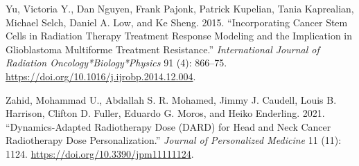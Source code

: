 \documentclass[
  letterpaper,
]{scrreprt}
\newlength{\cslhangindent}
\newenvironment{CSLReferences}[2] %
 {\begin{list}{}{%
  \setlength{\itemindent}{0pt}
  \setlength{\leftmargin}{0pt}
  \setlength{\parsep}{0pt}
  \ifodd #1
   \setlength{\leftmargin}{\cslhangindent}
   \setlength{\itemindent}{-1\cslhangindent}
  \fi
  \setlength{\itemsep}{#2\baselineskip}}}
 {\end{list}}
\theoremstyle{definition}
\theoremstyle{remark}
\begin{document}
\begin{CSLReferences}{1}{0}
Yu, Victoria Y., Dan Nguyen, Frank Pajonk, Patrick Kupelian, Tania
Kaprealian, Michael Selch, Daniel A. Low, and Ke Sheng. 2015.
{``Incorporating Cancer Stem Cells in Radiation Therapy Treatment
Response Modeling and the Implication in Glioblastoma Multiforme
Treatment Resistance.''} \emph{International Journal of Radiation
Oncology*Biology*Physics} 91 (4): 866--75.
\url{https://doi.org/10.1016/j.ijrobp.2014.12.004}.

Zahid, Mohammad U., Abdallah S. R. Mohamed, Jimmy J. Caudell, Louis B.
Harrison, Clifton D. Fuller, Eduardo G. Moros, and Heiko Enderling.
2021. {``Dynamics-Adapted Radiotherapy Dose (DARD) for Head and Neck
Cancer Radiotherapy Dose Personalization.''} \emph{Journal of
Personalized Medicine} 11 (11): 1124.
\url{https://doi.org/10.3390/jpm11111124}.

\end{CSLReferences}
\end{document}
